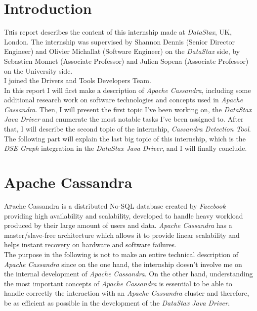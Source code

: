 \documentclass[a4paper]{report}
\newcommand\blankpage{%
    \null
    \thispagestyle{empty}%
    \addtocounter{page}{-1}%
    \newpage}
\newcommand{\ds}{\emph{DataStax\xspace}}
\newcommand{\djd}{\emph{DataStax Java Driver\xspace}}
\newcommand{\ca}{\emph{Apache Cassandra\xspace}}
\newcommand{\cdt}{\emph{Cassandra Detection Tool\xspace}}
\begin{document}
\afterpage{\blankpage}

\tableofcontents
\afterpage{\blankpage}



\chapter{Introduction}

\pagestyle{plain}
\lettrine[nindent=0em,lines=3]{T} his report describes the content of this internship made at \ds{}, UK, London. The internship was supervised by Shannon Dennis (Senior Director Engineer) and Olivier Michallat (Software Engineer) on the \ds{} side, by Sebastien Monnet (Associate Professor) and Julien Sopena (Associate Professor) on the University side.\\
I joined the Drivers and Tools Developers Team. \\
In this report I will first make a description of \ca{}, including some additional research work on software technologies and concepts used in \ca{}. Then, I will present the first topic I've been working on, the \djd{} and enumerate the most notable tasks I've been assigned to. After that, I will describe the second topic of the internship, \cdt{}. The following part will explain the last big topic of this internship, which is the \emph{DSE Graph} integration in the \djd{}, and I will finally conclude.

\chapter{Apache Cassandra}
\lettrine[nindent=0em,lines=3]{A} pache Cassandra is a distributed No-SQL database created by \emph{Facebook} providing high availability and scalability, developed to handle heavy workload produced by their large amount of users and data. \ca{} has a master/slave-free architecture which allows it to provide linear scalability and helps instant recovery on hardware and software failures.\\
The purpose in the following is not to make an entire technical description of \ca{} since on the one hand, the internship doesn't involve me on the internal development of \ca{}. On the other hand, understanding the most important concepts of \ca{} is essential to be able to handle correctly the interaction with an \ca{} cluster and therefore, be as efficient as possible in the development of the \djd{}.
\end{document}
